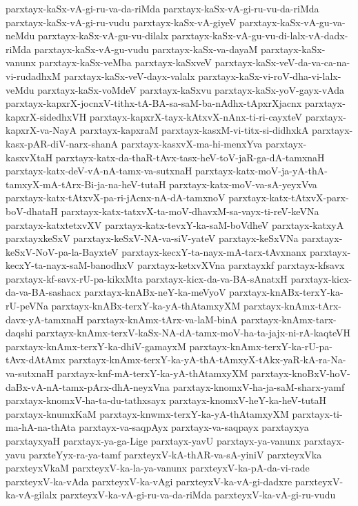 {parxtayx-kaSx-vA-gi-ru-va-da-riMda
parxtayx-kaSx-vA-gi-ru-vu-da-riMda
parxtayx-kaSx-vA-gi-ru-vudu
parxtayx-kaSx-vA-giyeV
parxtayx-kaSx-vA-gu-va-neMdu
parxtayx-kaSx-vA-gu-vu-dilalx
parxtayx-kaSx-vA-gu-vu-di-lalx-vA-dadx-riMda
parxtayx-kaSx-vA-gu-vudu
parxtayx-kaSx-va-dayaM
parxtayx-kaSx-vanunx
parxtayx-kaSx-veMba
parxtayx-kaSxveV
parxtayx-kaSx-veV-da-va-ca-na-vi-rudadhxM
parxtayx-kaSx-veV-dayx-valalx
parxtayx-kaSx-vi-roV-dha-vi-lalx-veMdu
parxtayx-kaSx-voMdeV
parxtayx-kaSxvu
parxtayx-kaSx-yoV-gayx-vAda
parxtayx-kapxrX-jocnxV-tithx-tA-BA-sa-saM-ba-nAdhx-tApxrXjacnx
parxtayx-kapxrX-sidedhxVH
parxtayx-kapxrX-tayx-kAtxvX-nAnx-ti-ri-cayxteV
parxtayx-kapxrX-va-NayA
parxtayx-kapxraM
parxtayx-kasxM-vi-titx-si-didhxkA
parxtayx-kasx-pAR-diV-narx-shanA
parxtayx-kasxvX-ma-hi-menxYva
parxtayx-kasxvXtaH
parxtayx-katx-da-thaR-tAvx-tasx-heV-toV-jaR-ga-dA-tamxnaH
parxtayx-katx-deV-vA-nA-tamx-va-sutxnaH
parxtayx-katx-moV-ja-yA-thA-tamxyX-mA-tArx-Bi-ja-na-heV-tutaH
parxtayx-katx-moV-va-sA-yeyxVva
parxtayx-katx-tAtxvX-pa-ri-jAcnx-nA-dA-tamxnoV
parxtayx-katx-tAtxvX-parx-boV-dhataH
parxtayx-katx-tatxvX-ta-moV-dhavxM-sa-vayx-ti-reV-keVNa
parxtayx-katxtetxvXV
parxtayx-katx-tevxY-ka-saM-boVdheV
parxtayx-katxyA
parxtayxkeSxV
parxtayx-keSxV-NA-va-siV-yateV
parxtayx-keSxVNa
parxtayx-keSxV-NoV-pa-la-BayxteV
parxtayx-kecxY-ta-nayx-mA-tarx-tAvxnanx
parxtayx-kecxY-ta-nayx-saM-banodhxV
parxtayx-ketxvXVna
parxtayxkf
parxtayx-kfsavx
parxtayx-kf-savx-rU-pa-kikxMta
parxtayx-kicx-da-va-BA-sAnatxH
parxtayx-kicx-da-va-BA-sashacx
parxtayx-knABx-neY-ka-meVyoV
parxtayx-knABx-terxY-ka-rU-peVNa
parxtayx-knABx-terxY-ka-yA-thAtamxyXM
parxtayx-knAmx-tArx-davx-yA-tamxnaH
parxtayx-knAmx-tArx-va-laM-binA
parxtayx-knAmx-tarx-daqshi
parxtayx-knAmx-terxV-kaSx-NA-dA-tamx-moV-ha-ta-jajx-ni-rA-kaqteVH
parxtayx-knAmx-terxY-ka-dhiV-gamayxM
parxtayx-knAmx-terxY-ka-rU-pa-tAvx-dAtAmx
parxtayx-knAmx-terxY-ka-yA-thA-tAmxyX-tAkx-yaR-kA-ra-Na-va-sutxnaH
parxtayx-knf-mA-terxY-ka-yA-thAtamxyXM
parxtayx-knoBxV-hoV-daBx-vA-nA-tamx-pArx-dhA-neyxVna
parxtayx-knomxV-ha-ja-saM-sharx-yamf
parxtayx-knomxV-ha-ta-du-tathxsayx
parxtayx-knomxV-heY-ka-heV-tutaH
parxtayx-knumxKaM
parxtayx-knwmx-terxY-ka-yA-thAtamxyXM
parxtayx-ti-ma-hA-na-thAta
parxtayx-va-saqpAyx
parxtayx-va-saqpayx
parxtayxya
parxtayxyaH
parxtayx-ya-ga-Lige
parxtayx-yavU
parxtayx-ya-vanunx
parxtayx-yavu
parxteYyx-ra-ya-tamf
parxteyxV-kA-thAR-va-sA-yiniV
parxteyxVka
parxteyxVkaM
parxteyxV-ka-la-ya-vanunx
parxteyxV-ka-pA-da-vi-rade
parxteyxV-ka-vAda
parxteyxV-ka-vAgi
parxteyxV-ka-vA-gi-dadxre
parxteyxV-ka-vA-gilalx
parxteyxV-ka-vA-gi-ru-va-da-riMda
parxteyxV-ka-vA-gi-ru-vudu
}
